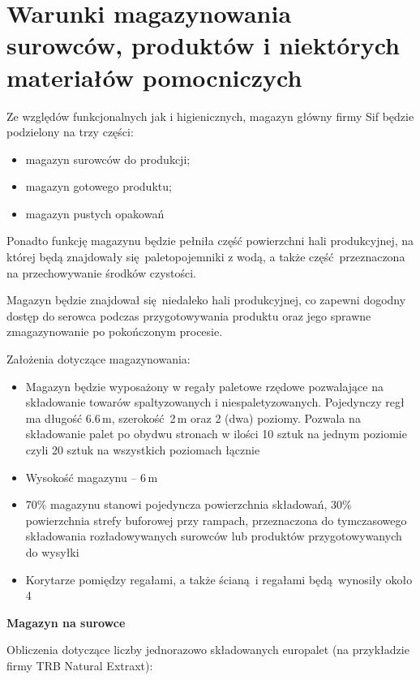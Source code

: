 \section{Warunki magazynowania surowców, produktów i niektórych materiałów pomocniczych}

Ze względów funkcjonalnych jak i higienicznych, magazyn główny firmy \textsf{Sif} będzie podzielony na trzy części:
\begin{itemize}
	\item magazyn surowców do produkcji;
	\item magazyn gotowego produktu;
	\item magazyn pustych opakowań
\end{itemize}

Ponadto funkcję magazynu będzie pełniła część powierzchni hali produkcyjnej, na której będą znajdowały się paletopojemniki z wodą, a także część przeznaczona na przechowywanie środków czystości.

Magazyn będzie znajdował się niedaleko hali produkcyjnej, co zapewni dogodny dostęp do serowca podczas przygotowywania produktu oraz jego sprawne zmagazynowanie po pokończonym procesie.

Założenia dotyczące magazynowania:
\begin{itemize}
	\item Magazyn będzie wyposażony w regały paletowe rzędowe pozwalające na składowanie towarów spaltyzowanych i niespaletyzowanych. Pojedynczy regł ma długość 6.6\,m, szerokość 2\,m oraz 2 (dwa) poziomy. Pozwala na składowanie palet po obydwu stronach w ilości 10 sztuk na jednym poziomie czyli 20 sztuk na wszystkich poziomach łącznie
	\item Wysokość magazynu -- 6\,m
	\item 70\% magazynu stanowi pojedyncza powierzchnia składowań, 30\% powierzchnia strefy buforowej przy rampach, przeznaczona do tymczasowego składowania rozładowywanych surowców lub produktów przygotowywanych do wysyłki
	\item Korytarze pomiędzy regałami, a także ścianą i regałami będą wynosiły około 4\,
\end{itemize}\vspace{\baselineskip}

\textbf{Magazyn na surowce}

Obliczenia dotyczące liczby jednorazowo składowanych europalet (na przykładzie firmy \textsf{TRB Natural Extraxt}):

